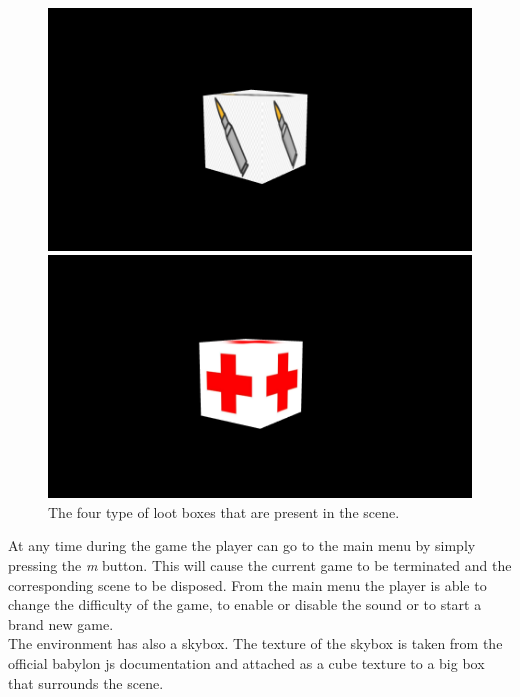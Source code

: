\documentclass[14pt]{article}
\begin{document}
\begin{figure}[H]
\center
\begin{minipage}[t]{0.4\textwidth}
\center
\includegraphics[width=\textwidth]{images/machinegun.png}
\end{minipage}
\hfill
\begin{minipage}[t]{0.4\textwidth}
\center
\includegraphics[width=\textwidth]{images/health.png}
\end{minipage}
\caption{The four type of loot boxes that are present in the scene.}
\label{img:lootBoxTypes}
\end{figure}






At any time during the game the player can go to the main menu by simply pressing the \textit{m} button. This will cause the current game to be terminated and the corresponding scene to be disposed. From the main menu the player is able to change the difficulty of the game, to enable or disable the sound or to start a brand new game.\\
The environment has also a skybox. The texture of the skybox is taken from the official babylon js documentation and attached as a cube texture to a big box that surrounds the scene.
\end{document}
